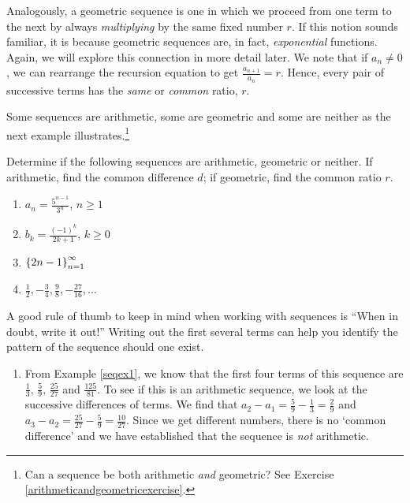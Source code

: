\documentclass{ximera}
\begin{document}
Analogously, a geometric sequence is one in which we proceed from one term to the next by always \textit{multiplying} by the same fixed number $r$. If this notion sounds familiar, it is because geometric sequences are, in fact, \textit{exponential} functions.  Again, we will explore this connection in more detail later.  We note that if $a_{n} \neq 0$, we can rearrange the recursion equation to get $\frac{a_{n+1}}{a_{n}} = r$.  Hence, every pair of successive terms has the \textit{same} or \textit{common} ratio, $r$.  


Some sequences are arithmetic, some are geometric and some are neither as the next example illustrates.\footnote{Can a sequence be both arithmetic \textit{and} geometric?  See Exercise \ref{arithmeticandgeometricexercise}.}

\begin{example}  \label{arithgeoex1}  Determine if the following sequences are arithmetic, geometric or neither.  If arithmetic, find the common difference $d$; if geometric, find the common ratio $r$.

\begin{enumerate}

\item  $a_{n} = \frac{5^{n-1}}{3^{n}}$, $n \geq 1$

\item  $b_{k} = \frac{(-1)^{k}}{2k+1}$, $k \geq 0$

\item  $\left\{ 2n - 1 \right\}_{n=1}^{\infty} \vphantom{\frac{1}{2}, -\frac{3}{4}, \frac{9}{8}, -\frac{27}{16}, \ldots}$

\item  $\frac{1}{2}, -\frac{3}{4}, \frac{9}{8}, -\frac{27}{16}, \ldots$

\end{enumerate}


\begin{explanation}  A good rule of thumb to keep in mind when working with sequences is ``When in doubt, write it out!''  Writing out the first several terms can help you identify the pattern of the sequence should one exist.

\begin{enumerate}

\item  From Example \ref{seqex1}, we know that the first four terms of this sequence are $\frac{1}{3}, \, \frac{5}{9}, \, \frac{25}{27}$ and $\frac{125}{81}$.  To see if this is an arithmetic sequence, we look at the successive differences of terms.  We find that $a_2 - a_1 = \frac{5}{9} - \frac{1}{3} = \frac{2}{9}$ and $a_3 - a_2 = \frac{25}{27} - \frac{5}{9} = \frac{10}{27}$.  Since we get different numbers, there is no `common difference' and we have established that the sequence is \textit{not} arithmetic.  


\end{enumerate}
\end{explanation}
\end{example}
\end{document}
